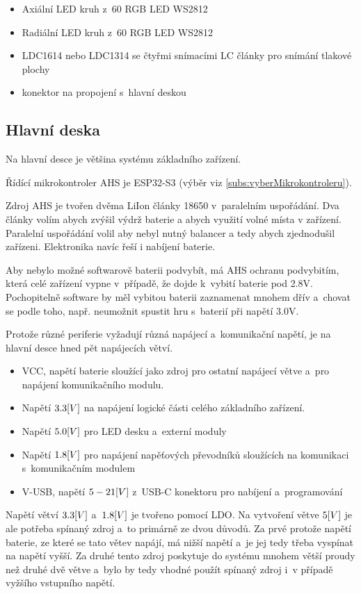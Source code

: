 \begin{itemize}
    \item Axiální LED kruh z~60 RGB LED WS2812
    \item Radiální LED kruh z~60 RGB LED WS2812
    \item LDC1614 nebo LDC1314 se čtyřmi snímacími LC články pro snímání tlakové plochy
    \item konektor na propojení s~hlavní deskou
\end{itemize}

\subsection{Hlavní deska}
Na hlavní desce je většina systému základního zařízení.

Řídící mikrokontroler AHS je ESP32-S3 (výběr viz \ref{subs:vyberMikrokontroleru}).

Zdroj AHS je tvořen dvěma LiIon články 18650 v~paralelním uspořádání.
Dva články volím abych zvýšil výdrž baterie a abych využití volné místa v zařízení.
Paralelní uspořádání volil aby nebyl nutný balancer a tedy abych zjednodušil zařízeni.
Elektronika navíc řeší i nabíjení baterie.

Aby nebylo možné softwarově baterii podvybít, má AHS ochranu podvybitím, která celé zařízení vypne v~případě, že dojde k~vybití baterie pod 2.8V.
Pochopitelně software by měl vybitou baterii zaznamenat mnohem dřív a~chovat se podle toho, např. neumožnit spustit hru s~baterií při napětí 3.0V.

Protože různé periferie vyžadují různá napájecí a~komunikační napětí, je na hlavní desce hned pět napájecích větví.
\begin{itemize}
    \item VCC, napětí baterie sloužící jako zdroj pro ostatní napájecí větve a~pro napájení komunikačního modulu. 
    \item Napětí \(3.3\-[V]\) na napájení logické části celého základního zařízení.
    \item Napětí \(5.0\-[V]\) pro LED desku a~externí moduly
    \item Napětí \(1.8\-[V]\) pro napájení napěťových převodníků sloužících na komunikaci s~komunikačním modulem 
    \item V-USB, napětí \(5\- - \-21\-[V]\) z~USB-C konektoru pro nabíjení a~programování
\end{itemize}
Napětí větví \(3.3\-[V]\) a~\(1.8\-[V]\) je tvořeno pomocí LDO.
Na vytvoření větve \(5\-[V]\) je ale potřeba spínaný zdroj a~to primárně ze dvou důvodů.
Za prvé protože napětí baterie, ze které se tato větev napájí, má nižší napětí a~je jej tedy třeba vyspínat na napětí vyšší.
Za druhé tento zdroj poskytuje do systému mnohem větší proudy než druhé dvě větve a~bylo by tedy vhodné použít spínaný zdroj i~v případě vyžšího vstupního napětí.


